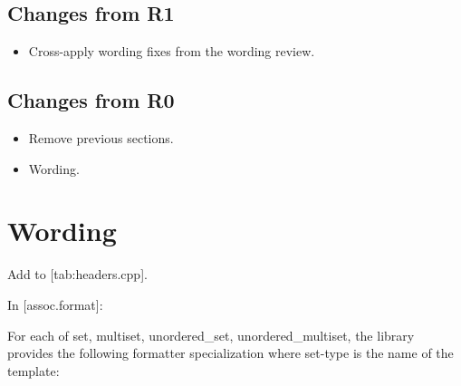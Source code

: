 \subsection{Changes from R1}

\begin{itemize}
  \item Cross-apply wording fixes from the  wording review.
\end{itemize}

\subsection{Changes from R0}

\begin{itemize}
  \item Remove previous sections.
  \item Wording.
\end{itemize}

\section{Wording}

Add  to [tab:headers.cpp].

In [assoc.format]:

For each of set, multiset, unordered_set,
unordered_multiset, the library provides
the following formatter specialization where set-type is the name of the
template:
